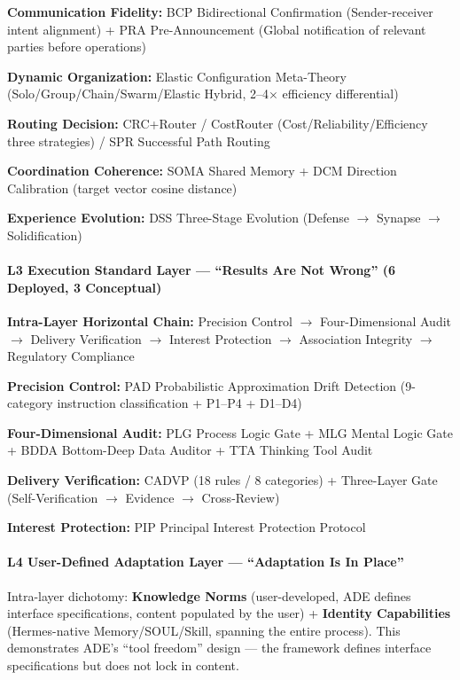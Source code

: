 \documentclass[11pt,a4paper]{article}
\begin{document}
\textbf{Communication Fidelity:} BCP Bidirectional Confirmation (Sender-receiver intent alignment) + PRA Pre-Announcement (Global notification of relevant parties before operations)

\textbf{Dynamic Organization:} Elastic Configuration Meta-Theory (Solo/Group/Chain/Swarm/Elastic Hybrid, 2--4$\times$ efficiency differential)

\textbf{Routing Decision:} CRC+Router / CostRouter (Cost/Reliability/Efficiency three strategies) / SPR Successful Path Routing

\textbf{Coordination Coherence:} SOMA Shared Memory + DCM Direction Calibration (target vector cosine distance)

\textbf{Experience Evolution:} DSS Three-Stage Evolution (Defense $\rightarrow$ Synapse $\rightarrow$ Solidification)

\paragraph{L3 Execution Standard Layer --- ``Results Are Not Wrong'' (6 Deployed, 3 Conceptual)}
\textbf{Intra-Layer Horizontal Chain:} Precision Control $\rightarrow$ Four-Dimensional Audit $\rightarrow$ Delivery Verification $\rightarrow$ Interest Protection $\rightarrow$ Association Integrity $\rightarrow$ Regulatory Compliance

\textbf{Precision Control:} PAD Probabilistic Approximation Drift Detection (9-category instruction classification + P1--P4 + D1--D4)

\textbf{Four-Dimensional Audit:} PLG Process Logic Gate + MLG Mental Logic Gate + BDDA Bottom-Deep Data Auditor + TTA Thinking Tool Audit

\textbf{Delivery Verification:} CADVP (18 rules / 8 categories) + Three-Layer Gate (Self-Verification $\rightarrow$ Evidence $\rightarrow$ Cross-Review)

\textbf{Interest Protection:} PIP Principal Interest Protection Protocol

\paragraph{L4 User-Defined Adaptation Layer --- ``Adaptation Is In Place''}
Intra-layer dichotomy: \textbf{Knowledge Norms} (user-developed, ADE defines interface specifications, content populated by the user) + \textbf{Identity Capabilities} (Hermes-native Memory/SOUL/Skill, spanning the entire process). This demonstrates ADE's ``tool freedom'' design --- the framework defines interface specifications but does not lock in content.
\end{document}
